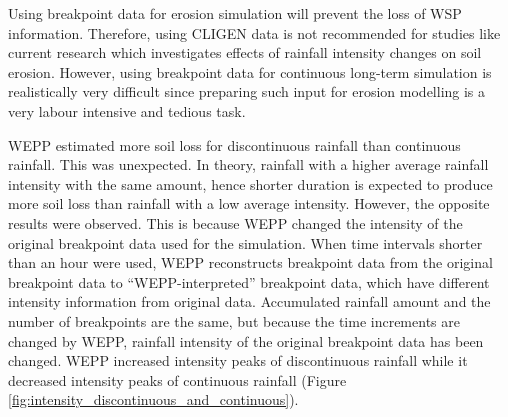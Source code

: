 

Using breakpoint data for erosion simulation will prevent the loss of WSP
information. Therefore, using CLIGEN data is not recommended for studies
like current research which investigates effects of rainfall intensity
changes on soil erosion. However, using breakpoint data for continuous long-term
simulation is realistically very difficult since preparing such input for
erosion modelling is a very labour intensive and tedious task.

WEPP estimated more soil loss for discontinuous rainfall than continuous
rainfall. This was unexpected. In theory, rainfall with a higher average
rainfall intensity with the same amount, hence shorter duration is expected to
produce more soil loss than rainfall with a low average intensity. However, the
opposite results were observed. This is because WEPP changed the intensity of
the original breakpoint data used for the simulation. When time intervals
shorter than an hour were used, WEPP reconstructs breakpoint data from the
original breakpoint data to ``WEPP-interpreted'' breakpoint data, which have
different intensity information from original data. Accumulated rainfall amount
and the number of breakpoints are the same, but because the time increments are
changed by WEPP, rainfall intensity of the original breakpoint data has been
changed. WEPP increased intensity peaks of discontinuous rainfall while it
decreased intensity peaks of continuous rainfall (Figure
\ref{fig:intensity_discontinuous_and_continuous}).

